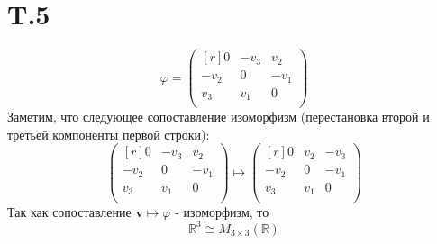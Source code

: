 \section*{T.5}
$$\varphi=\begin{pmatrix*}[r]
    0&-v_{3}&v_{2}\\
    -v_{2}&0&-v_{1}\\
    v_{3}&v_{1}&0\\
\end{pmatrix*}$$
Заметим, что следующее сопоставление изоморфизм (перестановка второй и третьей компоненты первой строки):
$$\begin{pmatrix*}[r]
    0&-v_{3}&v_{2}\\
    -v_{2}&0&-v_{1}\\
    v_{3}&v_{1}&0\\
\end{pmatrix*}\mapsto\begin{pmatrix*}[r]
    0&v_{2}&-v_{3}\\
    -v_{2}&0&-v_{1}\\
    v_{3}&v_{1}&0\\
\end{pmatrix*}$$
Так как сопоставление $\textbf{v}\mapsto\varphi$ - изоморфизм, то
$$\mathbb{R}^{3}\cong M_{3\times3}(\mathbb{R})$$
